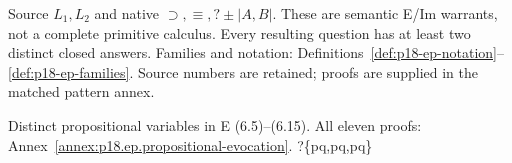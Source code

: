  {Source \(L_1,L_2\) and native \(\supset,\equiv,?\pm|A,B|\).
 These are semantic E/Im warrants, not a complete primitive calculus.
 Every resulting question has at least two distinct closed answers.
 Families and notation: Definitions~\ref{def:p18-ep-notation}--\ref{def:p18-ep-families}.
 Source numbers are retained; proofs are supplied in the matched pattern annex.}

 {Distinct propositional variables in E (6.5)--(6.15).
  All eleven proofs: Annex~\ref{annex:p18.ep.propositional-evocation}.}
 {?\{p\land q,p\land\neg q,\neg p\land q\}}{\none}

